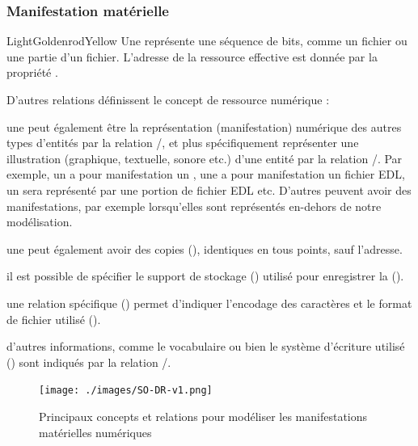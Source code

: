 \subsubsection*{Manifestation matérielle}
\begin{cadrecol}{LightGoldenrodYellow}
Une  représente une séquence de bits, comme un fichier ou une partie d'un fichier. 
L'adresse de la ressource effective est donnée par la propriété . 
\end{cadrecol}
D'autres relations définissent le concept de ressource numérique :
\begin{liste}
	\item une  peut également être la représentation (manifestation) numérique des autres types d'entités par la relation /, et plus spécifiquement représenter une illustration (graphique, textuelle, sonore etc.) d'une entité par la relation /.
	Par exemple, un  a pour manifestation un , une  a pour manifestation un fichier EDL, un  sera représenté par une portion de fichier EDL etc.
	D'autres  peuvent avoir des manifestations, par exemple lorsqu'elles sont représentés en-dehors de notre modélisation.\\
	
	\item une  peut également avoir des copies (), identiques en tous points, sauf l'adresse. 
	\item il est possible de spécifier le support de stockage () utilisé pour enregistrer la  ().\\
	
	\item une relation spécifique () permet d'indiquer l'encodage des caractères et le format de fichier utilisé ().
	\item d'autres informations, comme le vocabulaire ou bien le système d'écriture utilisé () sont indiqués par la relation /.
\end{liste}



\begin{figure}[ht!]
\centering
\texttt{[image: ./images/SO-DR-v1.png]}
\caption{Principaux concepts et relations pour modéliser les manifestations matérielles numériques}
\label{img:so-dr}
\end{figure}


